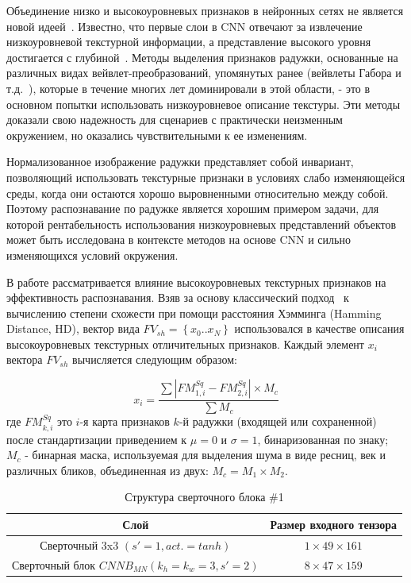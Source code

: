Объединение низко и высокоуровневых признаков в нейронных сетях не является новой идеей~\cite{ergun_2016,janani_2017,gao_2018}. Известно, что первые слои в CNN отвечают за извлечение низкоуровневой текстурной информации, а представление высокого уровня достигается с глубиной~\cite{zeiler_2014,harley_2015}. Методы выделения признаков радужки, основанные на различных видах вейвлет-преобразований, упомянутых ранее (вейвлеты Габора и т.д.~\cite{daugman_how_works,odinokikh_2017_fvc}), которые в течение многих лет доминировали в этой области, - это в основном попытки использовать низкоуровневое описание текстуры. Эти методы доказали свою надежность для сценариев с практически неизменным окружением, но оказались чувствительными к ее изменениям.

Нормализованное изображение радужки представляет собой инвариант, позволяющий использовать текстурные признаки в условиях слабо изменяющейся среды, когда они остаются хорошо выровненными относительно между собой. Поэтому распознавание по радужке является хорошим примером задачи, для которой рентабельность использования низкоуровневых представлений объектов может быть исследована в контексте методов на основе CNN и сильно изменяющихся условий окружения.

В работе рассматривается влияние высокоуровневых текстурных признаков на эффективность распознавания. Взяв за основу классический подход~\cite{daugman_how_works} к вычислению степени схожести при помощи расстояния Хэмминга (Hamming Distance, HD), вектор вида $FV_{sh}=\left\lbrace{x_0..x_N}\right\rbrace$ использовался в качестве описания высокоуровневых текстурных отличительных признаков. Каждый элемент $x_i$ вектора $FV_{sh}$ вычисляется следующим образом:

\begin{equation}
\label{eq:shallow-fv}
x_i = \frac{\sum|FM^{Sq}_{1,i}-FM^{Sq}_{2,i}| \times M_c}{\sum{M_c}}
\end{equation}
где $FM^{Sq}_{k,i}$ это $i$-я карта признаков $k$-й радужки (входящей или сохраненной) после стандартизации приведением к $\mu=0$ и $\sigma=1$, бинаризованная по знаку; $M_c$ - бинарная маска, используемая для выделения шума в виде ресниц, век и различных бликов, объединенная из двух: $M_c=M_1 \times M_2$.

\begin{table}
	\begin{center}
		\begin{tabular}{|c|c|}
			\hline
			\textbf{Слой}									& \textbf{Размер входного тензора} \\
			\hline
			Сверточный 3x3 $(s'=1, act.=tanh)$				& $1\times49\times161$\\
			Сверточный блок $CNNB_{MN} (k_h=k_w=3,s'=2)$ 	& $8\times47\times159$\\
			\hline
		\end{tabular}
		\caption{Структура сверточного блока \#1}
		\label{tab:conv-block-1}
	\end{center}
\end{table}

